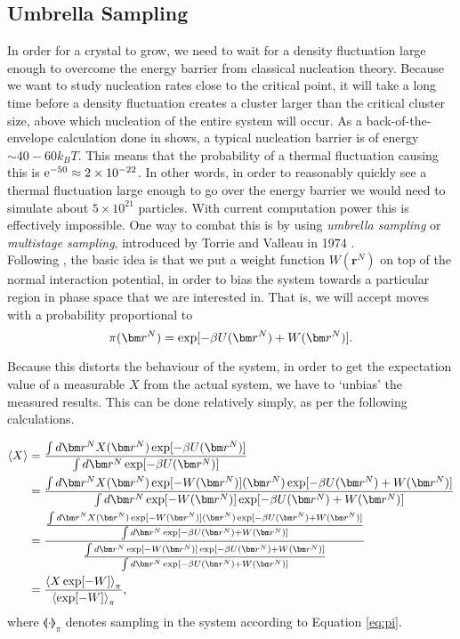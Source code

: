 \documentclass[thesis]{subfiles}
\begin{document}
\subsection{Umbrella Sampling}\label{subsec:US}

In order for a crystal to grow, we need to wait for a density fluctuation large enough to overcome the energy barrier from classical nucleation theory. Because we want to study nucleation rates close to the critical point, it will take a long time before a density fluctuation creates a cluster larger than the critical cluster size, above which nucleation of the entire system will occur. As a back-of-the-envelope calculation done in \cite{kalikmanov2013classical} shows, a typical nucleation barrier is of energy $\sim 40-60 k_BT$. This means that the probability of a thermal fluctuation causing this is $\mathrm{e}^{-50}\approx 2\times 10^{-22}$. In other words, in order to reasonably quickly see a thermal fluctuation large enough to go over the energy barrier we would need to simulate about $5\times 10^{21}$ particles. With current computation power this is effectively impossible. One way to combat this is by using \emph{umbrella sampling} or \emph{multistage sampling}, introduced by Torrie and Valleau in 1974 \cite{torrie1974monte}.\\

Following \cite{allen2004introduction}, the basic idea is that we put a weight function $W(\bm r^N)$ on top of the normal interaction potential, in order to bias the system towards a particular region in phase space that we are interested in. That is, we will accept moves with a probability proportional to
\begin{equation}
	\pi\argr = \exp [-\beta U\argr + W\argr].
\end{equation}\label{eq:pi}

Because this distorts the behaviour of the system, in order to get the expectation value of a measurable $X$ from the actual system, we have to `unbias' the measured results. This can be done relatively simply, as per the following calculations.

\begin{align}
	\llangle X \rrangle &= \frac{
		\int d\bm r^N X\argr \exp[-\beta U\argr]
	}{
		\int d\bm r^N \exp[-\beta U\argr]
	}\\
	&= \frac{
		\int d\bm r^N X\argr \exp[-W\argr] \argr \exp[-\beta U\argr + W\argr]
	}{
		\int d\bm r^N \exp[-W\argr] \exp[-\beta U\argr + W\argr]
	}\\
	&= \frac{
		\frac{
			\int d\bm r^N X\argr \exp[-W\argr] \argr \exp[-\beta U\argr + W\argr]
		}{
			\int d\bm r^N \exp[-\beta U\argr + W\argr]
		}
	}{
		\frac{
			\int d\bm r^N \exp[-W\argr] \exp[-\beta U\argr + W\argr]
		}{
			\int d\bm r^N \exp[-\beta U\argr + W\argr]
		}
	}\\
	&= \frac{
		\llangle X \exp[-W] \rrangle_\pi
	}{
		\llangle \exp[-W] \rrangle_\pi
	},
\end{align}
where $\llangle \cdot \rrangle_\pi$ denotes sampling in the system according to Equation \ref{eq:pi}. 
\end{document}
